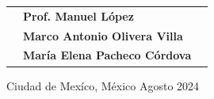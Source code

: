 \documentclass[12pt,letterpaper]{article}
\newcommand{\PjuryA}{Prof. Manuel López}
\newcommand{\PjuryB}{Marco Antonio Olivera Villa}
\newcommand{\PjuryC}{María Elena Pacheco Córdova}
\newcommand{\Pmonth}{Agosto}
\newcommand{\Pyear}{2024}
\begin{document}
\begin{minipage}[b][\textheight][c]{17.3cm}
\begin{center}
    \begin{flushleft}
      \large{ \begin{tabular}{p{3.5cm} l l}
        \raggedleft{Tribunal:} & {\bfseries\PjuryA\par}  \\
        & {\bfseries\PjuryB\par}  \\
        & {\bfseries\PjuryC\par}       \\
      \end{tabular}}
    \end{flushleft}
     \vspace{1cm}
    
    \vspace{1cm}
    Ciudad de Mexíco, México \hspace{4.5cm} \Pmonth \hspace{0.2cm} \Pyear
    \end{center}
\end{minipage}
\end{document}
